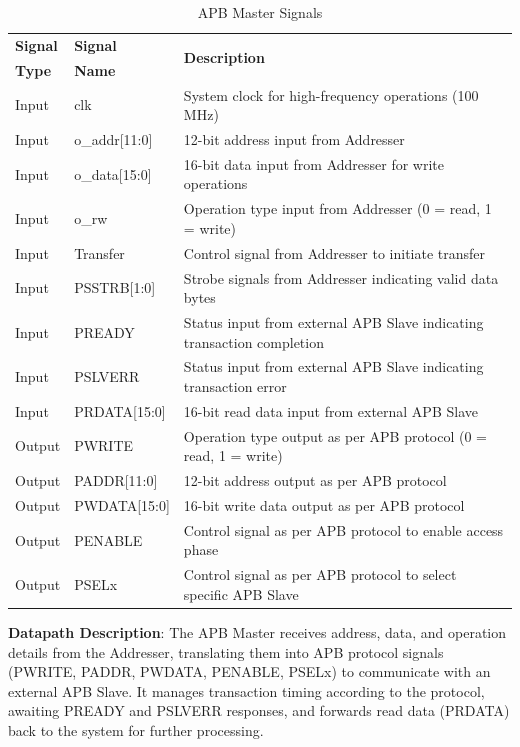 \begin{table}[!htb]
    \centering
    \caption{APB Master Signals}
    \label{tab:apb-master-signals}
    \begin{tabular}{|m{}|m{}|m{}|}
        \hline
        \textbf{Signal} & \textbf{Signal} & \multirow{2}{*}{\textbf{Description}} \\
        \textbf{Type} & \textbf{Name} & \\
        \hline
        Input & clk & System clock for high-frequency operations (100 MHz) \\
        Input & o\_addr[11:0] & 12-bit address input from Addresser \\
        Input & o\_data[15:0] & 16-bit data input from Addresser for write operations \\
        Input & o\_rw & Operation type input from Addresser (0 = read, 1 = write) \\
        Input & Transfer & Control signal from Addresser to initiate transfer \\
        Input & PSSTRB[1:0] & Strobe signals from Addresser indicating valid data bytes \\
        Input & PREADY & Status input from external APB Slave indicating transaction completion \\
        Input & PSLVERR & Status input from external APB Slave indicating transaction error \\
        Input & PRDATA[15:0] & 16-bit read data input from external APB Slave \\
        Output & PWRITE & Operation type output as per APB protocol (0 = read, 1 = write) \\
        Output & PADDR[11:0] & 12-bit address output as per APB protocol \\
        Output & PWDATA[15:0] & 16-bit write data output as per APB protocol \\
        Output & PENABLE & Control signal as per APB protocol to enable access phase \\
        Output & PSELx & Control signal as per APB protocol to select specific APB Slave \\
        \hline
    \end{tabular}
\end{table}

\textbf{Datapath Description}: The APB Master receives address, data, and operation details from the Addresser, translating them into APB protocol signals (PWRITE, PADDR, PWDATA, PENABLE, PSELx) to communicate with an external APB Slave. It manages transaction timing according to the protocol, awaiting PREADY and PSLVERR responses, and forwards read data (PRDATA) back to the system for further processing.

